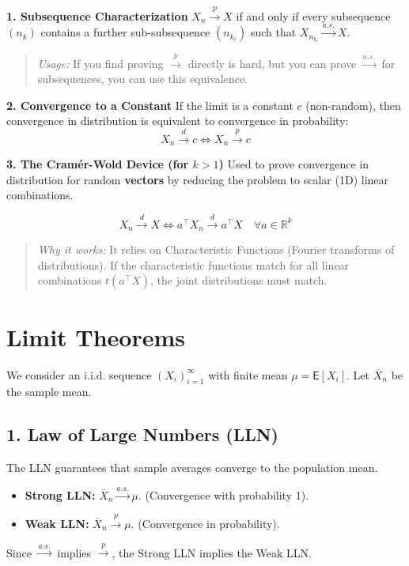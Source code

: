 \textbf{1. Subsequence Characterization}
$X_n \xrightarrow{p} X$ if and only if every subsequence $(n_k)$ contains a further sub-subsequence $(n_{k_\ell})$ such that $X_{n_{k_\ell}} \xrightarrow{a.s.} X$.
\begin{quote}
    \textit{Usage:} If you find proving $\xrightarrow{p}$ directly is hard, but you can prove $\xrightarrow{a.s.}$ for subsequences, you can use this equivalence.
\end{quote}

\textbf{2. Convergence to a Constant}
If the limit is a constant $c$ (non-random), then convergence in distribution is equivalent to convergence in probability:
\[ X_n \xrightarrow{d} c \iff X_n \xrightarrow{p} c \]

\textbf{3. The Cramér-Wold Device (for $k > 1$)}
Used to prove convergence in distribution for random \textbf{vectors} by reducing the problem to scalar (1D) linear combinations.

\[ X_n \xrightarrow{d} X \iff a^\top X_n \xrightarrow{d} a^\top X \quad \forall a \in \mathbb{R}^k \]
\begin{quote}
    \textit{Why it works:} It relies on Characteristic Functions (Fourier transforms of distributions). If the characteristic functions match for all linear combinations $t(a^\top X)$, the joint distributions must match.
\end{quote}

\section{Limit Theorems}

We consider an i.i.d. sequence $(X_i)_{i=1}^{\infty}$ with finite mean $\mu = \mathsf{E}[X_i]$. Let $\overline{X}_n$ be the sample mean.

\subsection*{1. Law of Large Numbers (LLN)}
The LLN guarantees that sample averages converge to the population mean.

\begin{itemize}
    \item \textbf{Strong LLN:} $\overline{X}_n \xrightarrow{a.s.} \mu$. (Convergence with probability 1).
    \item \textbf{Weak LLN:} $\overline{X}_n \xrightarrow{p} \mu$. (Convergence in probability).
\end{itemize}
\begin{remark}[]
Since $\xrightarrow{a.s.}$ implies $\xrightarrow{p}$, the Strong LLN implies the Weak LLN.
\end{remark}


